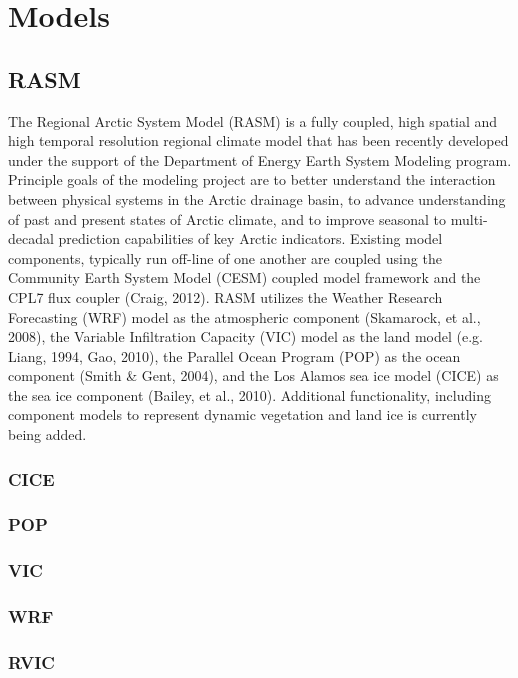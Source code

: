\section{Models}

\subsection{RASM}

The Regional Arctic System Model (RASM) is a fully coupled, high spatial and high temporal resolution regional climate model that has been recently developed under the support of the Department of Energy Earth System Modeling program.
Principle goals of the modeling project are to better understand the interaction between physical systems in the Arctic drainage basin, to advance understanding of past and present states of Arctic climate, and to improve seasonal to multi-decadal prediction capabilities of key Arctic indicators.
Existing model components, typically run off-line of one another are coupled using the Community Earth System Model (CESM) coupled model framework and the CPL7 flux coupler (Craig, 2012).
RASM utilizes the Weather Research Forecasting (WRF) model as the atmospheric component (Skamarock, et al., 2008), the Variable Infiltration Capacity (VIC) model as the land model (e.g. Liang, 1994, Gao, 2010), the Parallel Ocean Program (POP) as the ocean component (Smith & Gent, 2004), and the Los Alamos sea ice model (CICE) as the sea ice component (Bailey, et al., 2010).
Additional functionality, including component models to represent dynamic vegetation and land ice is currently being added.

\subsubsection{CICE}

\subsubsection{POP}

\subsubsection{VIC}

\subsubsection{WRF}

\subsubsection{RVIC}

